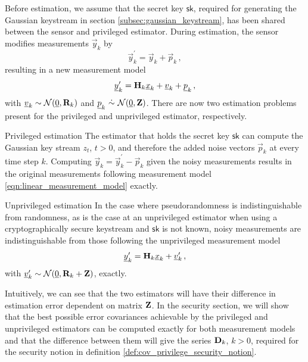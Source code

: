 \documentclass[letterpaper, 10 pt, conference]{ieeeconf}
\begin{document}
Before estimation, we assume that the secret key $\mathsf{sk}$, required for generating the Gaussian keystream in section \ref{subsec:gaussian_keystream}, has been shared between the sensor and privileged estimator. During estimation, the sensor modifies measurements $\vec{y}_k$ by
\begin{equation}\label{eqn:modified_measurement}
   \vec{y}^\prime_k = \vec{y}_k + \vec{p}_k\,,
\end{equation}
resulting in a new measurement model
\begin{equation}
   {\underline{y}}^\prime_k = {{\mathbf{H}}}_k{\underline{x}}_k + {\underline{v}}_k + {\underline{p}}_k\,,
\end{equation}
with ${\underline{v}}_k\sim \mathcal{N}({\underline{0}},{{\mathbf{R}}}_k)$ and $\vec{p}_k\ \dot{\sim}\ \mathcal{N}(\vec{0},\mat{Z})$. There are now two estimation problems present for the privileged and unprivileged estimator, respectively.
\begin{LaTeXdescription}
   \item[Privileged estimation] The estimator that holds the secret key $\mathsf{sk}$ can compute the Gaussian key stream $z_t$, $t>0$, and therefore the added noise vectors $\vec{p}_k$ at every time step $k$. Computing $\vec{y}_k = \vec{y}^\prime_k - \vec{p}_k$ given the noisy measurements results in the original measurements following measurement model \eqref{eqn:linear_measurement_model} exactly.
   \item[Unprivileged estimation] In the case where pseudorandomness is indistinguishable from randomness, as is the case at an unprivileged estimator when using a cryptographically secure keystream and $\mathsf{sk}$ is not known, noisy measurements are indistinguishable from those following the unprivileged measurement model 
   \begin{equation}\label{eqn:unprivileged_measurement_model}
      {\underline{y}}^\prime_k = {{\mathbf{H}}}_k{\underline{x}}_k + {\underline{v}}^\prime_k\,,
   \end{equation}
   with ${\underline{v}}^\prime_k\sim \mathcal{N}({\underline{0}},{{\mathbf{R}}}_k+{{\mathbf{Z}}})$, exactly.
\end{LaTeXdescription}

Intuitively, we can see that the two estimators will have their difference in estimation error dependent on matrix ${{\mathbf{Z}}}$. In the security section, we will show that the best possible error covariances achievable by the privileged and unprivileged estimators can be computed exactly for both measurement models and that the difference between them will give the series ${{\mathbf{D}}}_k$, $k>0$, required for the security notion in definition \ref{def:cov_privilege_security_notion}.
\end{document}
